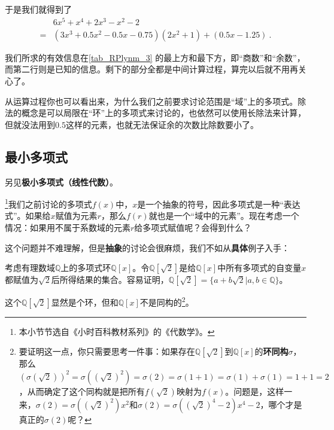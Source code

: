 于是我们就得到了
\begin{equation}
\begin{aligned}
&6x^5+x^4+2x^3-x^2-2 \\
= &(3x^3+0.5x^2-0.5x-0.75)(2x^2+1)+(0.5x-1.25)~.
\end{aligned}
\end{equation}

我们所求的有效信息在\autoref{tab_RPlynm_3} 的最上方和最下方，即“商数”和“余数”，而第二行则是已知的信息。剩下的部分全都是中间计算过程，算完以后就不用再关心了。

从运算过程你也可以看出来，为什么我们之前要求讨论范围是“域”上的多项式。除法的概念是可以局限在“环”上的多项式来讨论的，也依然可以使用长除法来计算，但就没法用到$0.5$这样的元素，也就无法保证余的次数比除数要小了。





\subsection{最小多项式}

另见\textbf{极小多项式（线性代数）}。

\footnote{本小节节选自《小时百科教材系列》的《代数学》。}我们之前讨论的多项式$f(x)$中，$x$是一个抽象的符号，因此多项式是一种“表达式”。如果给$x$赋值为元素$r$，那么$f(r)$就也是一个“域中的元素”。现在考虑一个情况：如果用不属于系数域的元素$r$给多项式赋值呢？会得到什么？

这个问题并不难理解，但是\textbf{抽象}的讨论会很麻烦，我们不如从\textbf{具体}例子入手：

\begin{example}{}

考虑有理数域$\mathbb{Q}$上的多项式环$\mathbb{Q}[x]$。令$\mathbb{Q}[\sqrt{2}]$是给$\mathbb{Q}[x]$中所有多项式的自变量$x$都赋值为$\sqrt{2}$后所得结果的集合。容易证明，$\mathbb{Q}[\sqrt{2}]=\{ a+b\sqrt{2}|a, b\in\mathbb{Q} \}$。

这个$\mathbb{Q}[\sqrt{2}]$显然是个环，但和$\mathbb{Q}[x]$不是同构的\footnote{要证明这一点，你只需要思考一件事：如果存在$\mathbb{Q}[\sqrt{2}]$到$\mathbb{Q}[x]$的\textbf{环同构}$\sigma$，那么$(\sigma(\sqrt{2}))^2=\sigma((\sqrt{2})^2)=\sigma(2)=\sigma(1+1)=\sigma(1)+\sigma(1)=1+1=2$，从而确定了这个同构就是把所有$f(\sqrt{2})$映射为$f(x)$。问题是，这样一来，$\sigma(2)=\sigma((\sqrt{2})^2)x^2$和$\sigma(2)=\sigma((\sqrt{2})^4-2)x^4-2$，哪个才是真正的$\sigma(2)$呢？}。


\end{example}


